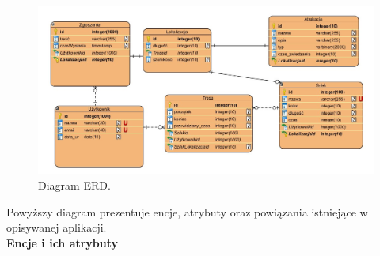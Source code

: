      \begin{figure}[H]
        \centering
        \includegraphics[width=\linewidth]{img/diagramy/erd.jpg}
        \caption{Diagram ERD.}
        \label{diagram:erd}
    \end{figure}
    Powyższy diagram prezentuje encje, atrybuty oraz powiązania istniejące w opisywanej aplikacji. \\
    \textbf{Encje i ich atrybuty}
